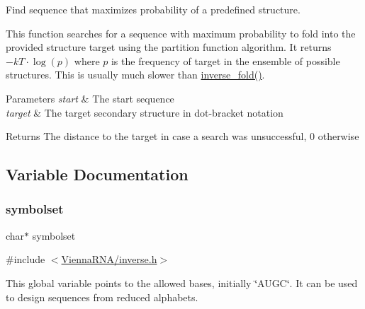Find sequence that maximizes probability of a predefined structure. 

This function searches for a sequence with maximum probability to fold into the provided structure \textquotesingle{}target\textquotesingle{} using the partition function algorithm. It returns $-kT \cdot \log(p)$ where $p$ is the frequency of \textquotesingle{}target\textquotesingle{} in the ensemble of possible structures. This is usually much slower than \mbox{\hyperlink{group__inverse__fold_ga7af026de55d4babad879f2c92559cbbc}{inverse\+\_\+fold()}}.


\begin{DoxyParams}{Parameters}
{\em start} & The start sequence \\
\hline
{\em target} & The target secondary structure in dot-\/bracket notation \\
\hline
\end{DoxyParams}
\begin{DoxyReturn}{Returns}
The distance to the target in case a search was unsuccessful, 0 otherwise 
\end{DoxyReturn}


\subsection{Variable Documentation}
\mbox{\label{group__inverse__fold_ga8f791e7740a5a28b9f6fafb4e60301d9}} 
\subsubsection{\texorpdfstring{symbolset}{symbolset}}
{\footnotesize\ttfamily char$\ast$ symbolset}



{\ttfamily \#include $<$\mbox{\hyperlink{inverse_8h}{Vienna\+R\+N\+A/inverse.\+h}}$>$}



This global variable points to the allowed bases, initially \char`\"{}\+A\+U\+G\+C\char`\"{}. It can be used to design sequences from reduced alphabets. 

\mbox{\label{group__inverse__fold_ga7f17d3b169af048d32bb185039a9c09c}} 
